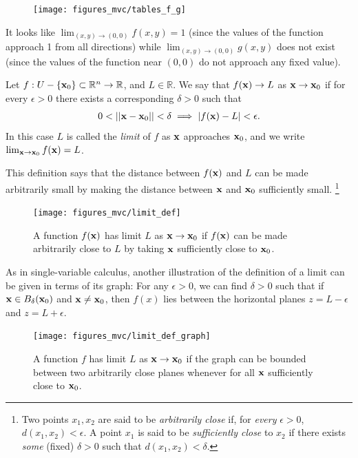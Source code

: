 \documentclass[12pt,letterpaper,reqno]{article}
\numberwithin{equation}{section}
\newcommand{\bx}{{\bf x}}
\begin{document}
{\begin{figure}[h]
\begin{center}
\texttt{[image: figures\_mvc/tables\_f\_g]}
\end{center}	
\end{figure}
It looks like $\lim_{(x,y) \to (0,0)}f(x,y)=1$ (since the values of the function approach 1 from all directions) while $\lim_{(x,y) \to (0,0)}g(x,y)$ does not exist (since the values of the function near $(0,0)$ do not approach any fixed value).

\begin{defn}[Limit]\label{def:limit}
	Let $f:U-\{\bx_0\} \subset \mathbb{R}^n \to \mathbb{R}$, and $L \in \mathbb{R}$. We say that $f(\bx) \to L$ as $\bx \to \bx_0$ if for every $\epsilon > 0$ there exists a corresponding $\delta>0$ such that
\begin{align*}
	0<||\bx-\bx_0||<\delta \implies |f(\bx)-L|<\epsilon.
\end{align*}
In this case $L$ is called the \emph{limit} of $f$ as $\bx$ approaches $\bx_0$, and  we write $\lim_{\bx \to \bx_0}f(\bx)=L$.
\end{defn}
This definition says that the distance between $f(\bx)$ and $L$ can be made arbitrarily small by making the distance between $\bx$ and  $\bx_0$ sufficiently small. \footnote{Two points $x_1,x_2$ are said to be \emph{arbitrarily close} if, for \emph{every} $\epsilon>0$, $d(x_1,x_2)<\epsilon$. A point $x_1$ is said to be \emph{sufficiently close} to $x_2$ if there exists \emph{some} (fixed) $\delta>0$ such that $d(x_1,x_2)<\delta$.}

\begin{figure}[h]
	\begin{center}
	\texttt{[image: figures\_mvc/limit\_def]}
\end{center}
\caption{A function $f(\bx)$ has limit $L$ as $\bx \to \bx_0$ if $f(\bx)$ can be made arbitrarily close to $L$ by taking $\bx$ sufficiently close to $\bx_0$.}
\end{figure}

\newpage

As in single-variable calculus, another illustration of the definition of a limit can be given in terms of its graph: For any $\epsilon>0$, we can find $\delta>0$ such that if $\bx \in B_\delta(\bx_0)$ and $\bx \neq \bx_0$, then $f(x)$ lies between the horizontal planes $z=L-\epsilon$ and $z=L+\epsilon$.

	\begin{figure}[h]
		\begin{center}
	\texttt{[image: figures\_mvc/limit\_def\_graph]}
	\end{center}
	\caption{A function $f$ has limit $L$ as $\bx \to \bx_0$ if the graph can be bounded between two arbitrarily close planes whenever for all $\bx$ sufficiently close to $\bx_0$.}
	\end{figure}
	
}
\end{document}
